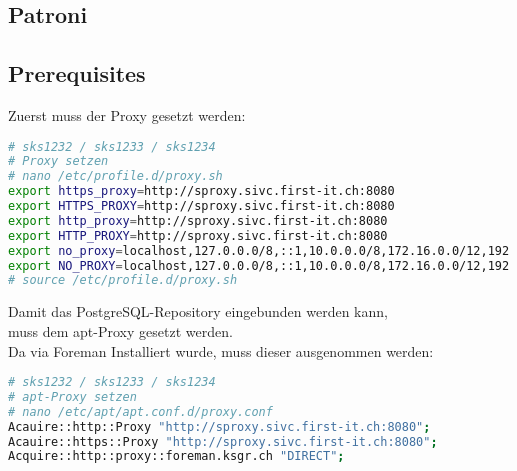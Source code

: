 
\begin{flushleft}
    \section{Patroni}
    \subsection{Prerequisites}
\end{flushleft}
\begin{flushleft}
    Zuerst muss der Proxy gesetzt werden:
    \lstset{style=gra_codestyle}
\begin{lstlisting}[language=bash, caption=Patroni - Proxy Settings,captionpos=b,label={lst:patroni-proxy-settings},breaklines=true]
# sks1232 / sks1233 / sks1234
# Proxy setzen
# nano /etc/profile.d/proxy.sh
export https_proxy=http://sproxy.sivc.first-it.ch:8080
export HTTPS_PROXY=http://sproxy.sivc.first-it.ch:8080
export http_proxy=http://sproxy.sivc.first-it.ch:8080
export HTTP_PROXY=http://sproxy.sivc.first-it.ch:8080
export no_proxy=localhost,127.0.0.0/8,::1,10.0.0.0/8,172.16.0.0/12,192.168.0.0/16
export NO_PROXY=localhost,127.0.0.0/8,::1,10.0.0.0/8,172.16.0.0/12,192.168.0.0/16
# source /etc/profile.d/proxy.sh
\end{lstlisting}
\end{flushleft}
\begin{flushleft}
    Damit das PostgreSQL-Repository eingebunden werden kann,\\
    muss dem apt-Proxy gesetzt werden.\\
    Da via \Gls{Foreman} Installiert wurde, muss dieser ausgenommen werden:
    \lstset{style=gra_codestyle}
\begin{lstlisting}[language=bash, caption=Patroni - apt-Proxy Settings,captionpos=b,label={lst:patroni-apt-proxy-settings},breaklines=true]
# sks1232 / sks1233 / sks1234
# apt-Proxy setzen
# nano /etc/apt/apt.conf.d/proxy.conf
Acauire::http::Proxy "http://sproxy.sivc.first-it.ch:8080";
Acauire::https::Proxy "http://sproxy.sivc.first-it.ch:8080";
Acquire::http::proxy::foreman.ksgr.ch "DIRECT";
\end{lstlisting}
\end{flushleft}

